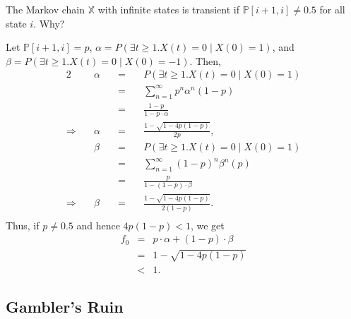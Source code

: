 \begin{exercise}
The Markov chain $ \mathbb{X} $ with infinite states is transient if $ \mathbb{P}[i + 1, i] \neq 0.5 $ for all state $ i $. Why?

\begin{solution}
Let $ \mathbb{P}[i + 1, i] = p $, $ \alpha = P(\exists t \ge 1 . X(t) = 0 \mid X(0) = 1) $, and $ \beta = P(\exists t \ge 1 . X(t) = 0 \mid X(0) = -1) $. Then,
\begin{alignat*}{2}
  & \alpha
    & \quad=\quad & P(\exists t \ge 1 . X(t) = 0 \mid X(0) = 1) \\
  & & \quad=\quad & \sum_{n = 1}^{\infty} p^{n} \alpha^{n} (1 - p) \\
  & & \quad=\quad & \frac{1 - p}{1 - p \cdot \alpha} \\
\Rightarrow\quad
  & \alpha
    & \quad=\quad & \frac{1 - \sqrt{1 - 4p(1 - p)}}{2p}, \\
  & \beta
    & \quad=\quad & P(\exists t \ge 1 . X(t) = 0 \mid X(0) = 1) \\
  & & \quad=\quad & \sum_{n = 1}^{\infty} (1 - p)^{n} \beta^{n} (p) \\
  & & \quad=\quad & \frac{p}{1 - (1 - p) \cdot \beta} \\
\Rightarrow\quad
  & \beta
    & \quad=\quad & \frac{1 - \sqrt{1 - 4p(1 - p)}}{2(1 - p)}. \\
\end{alignat*}
Thus, if $ p \neq 0.5 $ and hence $ 4p(1 - p) < 1 $, we get
\begin{eqnarray*}
f_{0}
  & = & p \cdot \alpha + (1 - p) \cdot \beta \\
  & = & 1 - \sqrt{1 - 4p(1 - p)} \\
  & < & 1.
\end{eqnarray*}
\end{solution}
\end{exercise}

\subsection{Gambler's Ruin} \label{subsec:gambler-ruin}

